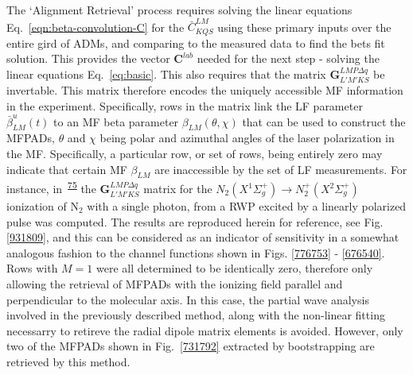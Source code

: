 \documentclass[10pt]{article}
\begin{document}
The `Alignment Retrieval' process requires solving the linear equations Eq.~\ref{eqn:beta-convolution-C} for the $\bar{C}^{LM}_{KQS}$ using these primary inputs over the entire gird of ADMs, and comparing to the measured data to find the bets fit solution. This provides the vector $\mathbf{C}^{lab}$ needed for the next step - solving the linear equations Eq.~\ref{eq:basic}. This also requires that the matrix $\mathbf{{G}}^{LMP\Delta q }_{L'M'KS}$ be invertable. This matrix therefore encodes the uniquely accessible MF information in the experiment. Specifically, rows in the matrix link the LF parameter $\bar{\beta}^u_{LM}(t)$  to an MF beta parameter $\beta_{LM}(\theta,\chi)$ that can be used to construct the MFPADs, $\theta$ and $\chi$ being polar and azimuthal angles of the laser polarization in the MF. Specifically, a particular row, or set of rows, being entirely zero may indicate that certain MF $\beta_{LM}$ are inaccessible by the set of LF measurements. For instance, in~\textsuperscript{\hyperref[csl:75]{75}} the $\mathbf{{G}}^{LMP\Delta q }_{L'M'KS}$ matrix for the $N_2(X^{1}\Sigma^{+}_{g}) \rightarrow N^+_2(X^{2}\Sigma^{+}_{g})$ ionization of N$_2$ with a single photon, from a RWP excited by a linearly polarized pulse was computed. The results are reproduced herein for reference, see Fig. \ref{931809}, and this can be considered as an indicator of sensitivity in a somewhat analogous fashion to the channel functions shown in Figs. \ref{776753} - \ref{676540}. Rows with $M = 1$ were all determined to be identically zero, therefore only allowing the retrieval of MFPADs with the ionizing field parallel and perpendicular to the molecular axis. In this case, the partial wave analysis involved in the previously described method, along with the non-linear fitting necessarry to retireve the radial dipole matrix elements is avoided. However, only two of the MFPADs shown in Fig.~\ref{731792} extracted by bootstrapping are retrieved by this method.\\
\end{document}
